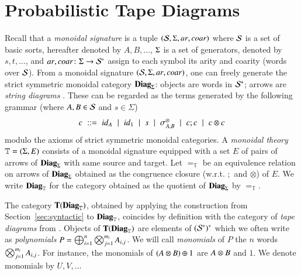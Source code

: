
\section{Probabilistic Tape Diagrams}\label{sec:tapediagrams}
%
Recall that a \emph{monoidal signature} is a tuple $(\mathcal{S}, \Sigma, \mathit{ar}, \mathit{coar})$ where $\mathcal{S}$ is a set of basic sorts, hereafter denoted by $A,B,\dots$, $\Sigma$ is a set of generators, denoted by $s,t, \dots$, and $\mathit{ar},\mathit{coar} \colon \Sigma \to \mathcal{S}^*$ assign to each symbol its arity and coarity (words over $\mathcal{S}$). From a monoidal signature $(\mathcal{S}, \Sigma, \mathit{ar}, \mathit{coar})$, one can freely generate the strict symmetric monoidal category $\mathbf{Diag}_{\Sigma}$:  objects are words in $\mathcal{S}^*$; arrows are \emph{string diagrams} \cite{joyal1991geometry,selinger2010survey}. These can be regarded  as the terms generated by the following grammar (where $A,B \in \mathcal{S}$ and $s \in \Sigma$)
\begin{equation}\label{stringdiagramGrammar}
\setlength{\arraycolsep}{3pt} %
\renewcommand{\arraystretch}{1.1} %
\begin{array}{rcccccccccccccccc}
c & ::= & \id{A} & \mid & \id{\uno} & \mid & \gen & \mid & \symmt{A}{B} & \mid & c ; c & \mid & c \per c
\end{array}
\end{equation}
modulo the axioms of strict symmetric monoidal categories. A \emph{monoidal theory} $\mathbb{T}=(\Sigma, E)$ consists of a monoidal signature equipped with a set $E$ of pairs of arrows of $\mathbf{Diag}_{\Sigma}$ with same source and target. Let $=_{\mathbb{T}}$ be an equivalence relation on arrows  of $\mathbf{Diag}_{\Sigma}$ obtained as the congruence closure (w.r.t. $;$ and $\otimes$) of $E$. We write $\mathbf{Diag}_{\mathbb{T}}$ for the category obtained as the quotient of $\mathbf{Diag}_{\Sigma}$ by $=_{\mathbb{T}}$.

\medskip

The category $\mathbf{T}(\mathbf{Diag}_{\mathbb{T}})$, obtained by applying the construction from Section~\ref{sec:syntactic} to $\mathbf{Diag}_{\mathbb{T}}$, coincides by definition with the category of \emph{tape diagrams} from \cite{bonchi2025tapediagramsmonoidalmonads}. Objects of $\mathbf{T}(\mathbf{Diag}_{\mathbb{T}})$ are elements of $(\mathcal{S}^*)^*$ which we often write as \emph{polynomials} $P=\Piu[i=1][n]{\Per[j=1][m_i]{A_{i,j}}}$. 
We will call \emph{monomials} of $P$ the $n$ words $\Per[j=1][m_i]{A_{i,j}}$. For instance, the monomials of $(A \otimes B) \oplus 1$ are $A \otimes B$ and $1$. We denote monomials by $U,V,\dots$

